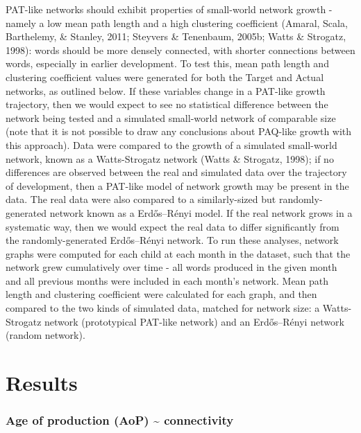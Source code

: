 \documentclass[
  english,
  man,floatsintext]{apa6}
\begin{document}
PAT-like networks should exhibit properties of small-world network growth - namely a low mean path length and a high clustering coefficient (Amaral, Scala, Barthelemy, \& Stanley, 2011; Steyvers \& Tenenbaum, 2005b; Watts \& Strogatz, 1998): words should be more densely connected, with shorter connections between words, especially in earlier development. To test this, mean path length and clustering coefficient values were generated for both the Target and Actual networks, as outlined below. If these variables change in a PAT-like growth trajectory, then we would expect to see no statistical difference between the network being tested and a simulated small-world network of comparable size (note that it is not possible to draw any conclusions about PAQ-like growth with this approach). Data were compared to the growth of a simulated small-world network, known as a Watts-Strogatz network (Watts \& Strogatz, 1998); if no differences are observed between the real and simulated data over the trajectory of development, then a PAT-like model of network growth may be present in the data. The real data were also compared to a similarly-sized but randomly-generated network known as a Erdős--Rényi model. If the real network grows in a systematic way, then we would expect the real data to differ significantly from the randomly-generated Erdős--Rényi network. To run these analyses, network graphs were computed for each child at each month in the dataset, such that the network grew cumulatively over time - all words produced in the given month and all previous months were included in each month's network. Mean path length and clustering coefficient were calculated for each graph, and then compared to the two kinds of simulated data, matched for network size: a Watts-Strogatz network (prototypical PAT-like network) and an Erdős--Rényi network (random network).

\hypertarget{results}{%
\section{Results}\label{results}}

\hypertarget{age-of-production-aop-connectivity}{%
\subsubsection{Age of production (AoP) \textasciitilde{} connectivity}\label{age-of-production-aop-connectivity}}
\end{document}
